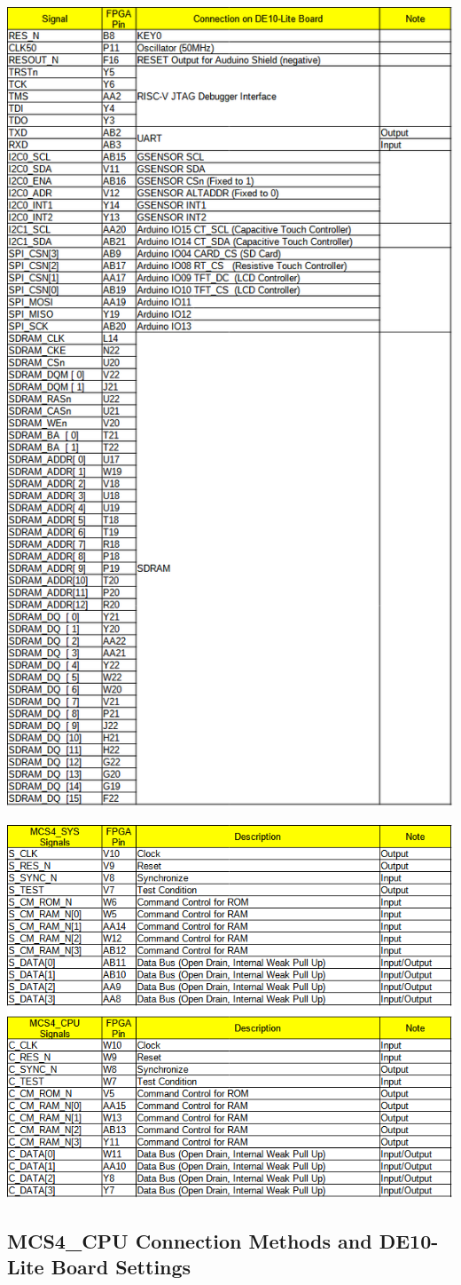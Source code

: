 \begin{table}[htbp]
    \includegraphics[width=0.5\columnwidth]{./Table/EXTFPGARISCV.png}
    \caption{RISC-V related External Signals except for GPIO}
    \label{tb:EXTFPGARISCV}
\end{table}
\begin{table}[htbp]
    \includegraphics[width=0.5\columnwidth]{./Table/EXTFPGAMCS4CPU.png}
    \caption{MCS4\_CPU (4004 CPU) related External Signals}
    \label{tb:EXTFPGAMCS4CPU}
\end{table}

\subsection{MCS4\_CPU Connection Methods and DE10-Lite Board Settings}
